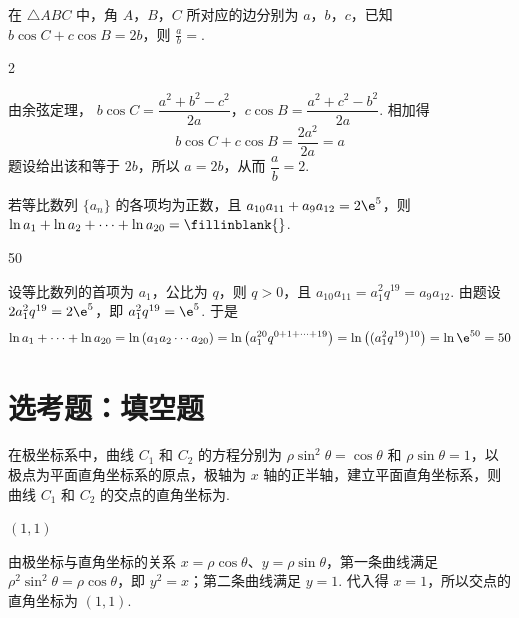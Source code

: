 \begin{problem}
在 \(\triangle ABC\) 中，角 \(A\)，\(B\)，\(C\) 所对应的边分别为 \(a\)，\(b\)，\(c\)，已知 \(b \cos C + c \cos B = 2b\)，则 \(\frac{a}{b} =\)\fillinblank{}.
\end{problem}

\begin{answer}
2
\end{answer}

\begin{solution}
由余弦定理，
\(b\cos C=\dfrac{a^2+b^2-c^2}{2a}\)，\(c\cos B=\dfrac{a^2+c^2-b^2}{2a}\). 相加得
\[
b\cos C+c\cos B=\frac{2a^2}{2a}=a
\]
题设给出该和等于 \(2b\)，所以 \(a=2b\)，从而 \(\dfrac ab=2\).
\end{solution}

\begin{problem}
若等比数列 \(\{a_{n}\}\) 的各项均为正数，且 \(a_{10}a_{11} + a_{9}a_{12} = 2\e^{5}\)，则 \(\ln a_1 + \ln a_2 + \cdots + \ln a_{20} =\fillinblank{}\).
\end{problem}

\begin{answer}
50
\end{answer}

\begin{solution}
设等比数列的首项为 \(a_1\)，公比为 \(q\)，则 \(q>0\)，且
\(a_{10}a_{11}=a_1^2q^{19}=a_9a_{12}\). 由题设
\(2a_1^2q^{19}=2\e^5\)，即 \(a_1^2q^{19}=\e^5\). 于是
\[
\ln a_1+\cdots+\ln a_{20}
=\ln\left(a_1a_2\cdots a_{20}\right)
=\ln\left(a_1^{20}q^{0+1+\cdots+19}\right)
=\ln\left((a_1^2q^{19})^{10}\right)=\ln\e^{50}=50
\]
\end{solution}

\section{选考题：填空题}

\begin{problem}
在极坐标系中，曲线 \(C_1\) 和 \(C_2\) 的方程分别为 \(\rho \sin^2 \theta = \cos \theta\) 和 \(\rho \sin \theta = 1\)，以极点为平面直角坐标系的原点，极轴为 \(x\) 轴的正半轴，建立平面直角坐标系，则曲线 \(C_1\) 和 \(C_2\) 的交点的直角坐标为\fillinblank{}.
\end{problem}

\begin{answer}
\((1,1)\)
\end{answer}

\begin{solution}
由极坐标与直角坐标的关系 \(x=\rho\cos\theta\)、\(y=\rho\sin\theta\)，第一条曲线满足
\(\rho^2\sin^2\theta=\rho\cos\theta\)，即 \(y^2=x\)；第二条曲线满足 \(y=1\). 代入得 \(x=1\)，所以交点的直角坐标为 \((1,1)\).
\end{solution}

